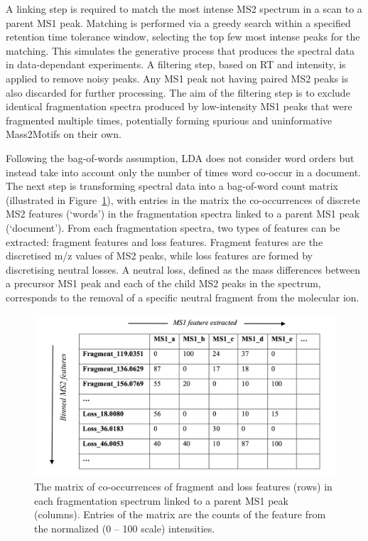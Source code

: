 A linking step is required to match the most intense MS2 spectrum in a scan to a parent MS1 peak. Matching is performed via a greedy search within a specified retention time tolerance window, selecting the top few most intense peaks for the matching. This simulates the generative process that produces the spectral data in data-dependant experiments. A filtering step, based on RT and intensity, is applied to remove noisy peaks. Any MS1 peak not having paired MS2 peaks is also discarded for further processing. The aim of the filtering step is to exclude identical fragmentation spectra produced by low-intensity MS1 peaks that were fragmented multiple times, potentially forming spurious and uninformative Mass2Motifs on their own. 

Following the bag-of-words assumption, LDA does not consider word orders but instead take into account only the number of times word co-occur in a document. The next step is transforming spectral data into a bag-of-word count matrix (illustrated in Figure~\ref{fig:m2lda-matrix}), with entries in the matrix the co-occurrences of discrete MS2 features (`words') in the fragmentation spectra linked to a parent MS1 peak (`document'). From each fragmentation spectra, two types of features can be extracted: fragment features and loss features. Fragment features are the discretised m/z values of MS2 peaks, while loss features are formed by discretising neutral losses. A neutral loss, defined as the mass differences between a precursor MS1 peak and each of the child MS2 peaks in the spectrum, corresponds to the removal of a specific neutral fragment from the molecular ion. 

\begin{figure}[!htbp]
\centering\includegraphics[width=0.8\linewidth]{07-lda/figures/matrix.pdf}
\centering\caption[The matrix of co-occurrences of fragment and loss features (rows) in each fragmentation spectrum linked to a parent MS1 peak (columns). ]{The matrix of co-occurrences of fragment and loss features (rows) in each fragmentation spectrum linked to a parent MS1 peak (columns). Entries of the matrix are the counts of the feature from the normalized (0 – 100 scale) intensities.\label{fig:m2lda-matrix}}
\end{figure}

